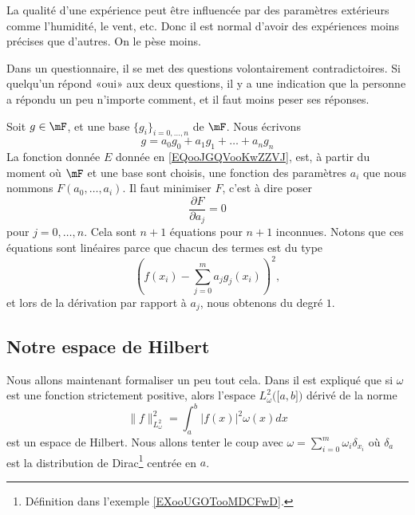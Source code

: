 \begin{example}
    La qualité d'une expérience peut être influencée par des paramètres extérieurs comme l'humidité, le vent, etc. Donc il est normal d'avoir des expériences moins précises que d'autres. On le pèse moins.
\end{example}

\begin{example}
    Dans un questionnaire, il se met des questions volontairement contradictoires. Si quelqu'un répond «oui» aux deux questions, il y a une indication que la personne a répondu un peu n'importe comment, et il faut moins peser ses réponses.
\end{example}

Soit \( g\in \mF\), et une base \( \{ g_i \}_{i=0,\ldots, n}\) de \( \mF\). Nous écrivons
\begin{equation}
    g=a_0g_0+a_1g_1+\ldots +a_ng_n
\end{equation}
La fonction donnée \( E\) donnée en \eqref{EQooJGQVooKwZZVJ}, est, à partir du moment où \( \mF\) et une base sont choisis, une fonction des paramètres \( a_i\) que nous nommons \( F(a_0,\ldots, a_i)\). Il faut minimiser \( F\), c'est à dire poser
\begin{equation}
    \frac{ \partial F }{ \partial a_j }=0
\end{equation}
pour \( j=0,\ldots, n\). Cela sont \( n+1\) équations pour \( n+1\) inconnues. Notons que ces équations sont linéaires parce que chacun des termes est du type
\begin{equation}
    \left( f(x_i)-\sum_{j=0}^ma_jg_j(x_i) \right)^2,
\end{equation}
et lors de la dérivation par rapport à \( a_j\), nous obtenons du degré \( 1\). 

\subsection{Notre espace de Hilbert}

Nous allons maintenant formaliser un peu tout cela. Dans \cite{ooPTFGooScbUWC} il est expliqué que si \( \omega\) est une fonction strictement positive, alors l'espace \( L^2_{\omega}\big( \mathopen[ a , b \mathclose] \big)\) dérivé de la norme
\begin{equation}
    \| f \|_{L^2_{\omega}}^2=\int_a^b| f(x) |^2\omega(x)dx
\end{equation}
est un espace de Hilbert. Nous allons tenter le coup avec \( \omega=\sum_{i=0}^m\omega_i\delta_{x_i}\) où \( \delta_a\) est la distribution de Dirac\footnote{Définition dans l'exemple \ref{EXooUGOTooMDCFwD}.} centrée en \( a\).

